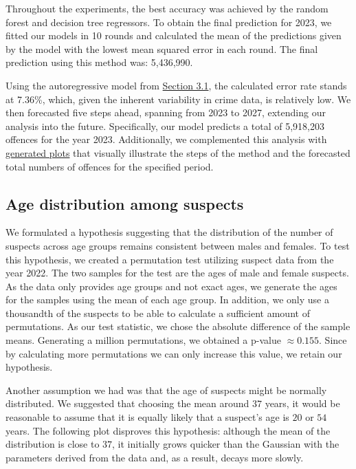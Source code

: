 \documentclass{article}
\theoremstyle{plain}
\theoremstyle{definition}
\theoremstyle{remark}
\begin{document}
Throughout the experiments, the best accuracy was achieved by the random forest and decision tree regressors. To obtain the final prediction for 2023, we fitted our models in 10 rounds and calculated the mean of the predictions given by the model with the lowest mean squared error in each round. The final prediction using this method was: 5,436,990.



Using the autoregressive model from \hyperref[subsec:methods_prediction]{Section 3.1}, the calculated error rate stands at 7.36\%, which, given the inherent variability in crime data, is relatively low. We then forecasted five steps ahead, spanning from 2023 to 2027, extending our analysis into the future. Specifically, our model predicts a total of 5,918,203 offences for the year 2023. Additionally, we complemented this analysis with \href{https://github.com/rojan-abolhasani/Order-in-Chaos-Understanding-Criminal-Patterns-in-Germany}{generated plots} that visually illustrate the steps of the method and the forecasted total numbers of offences for the specified period.

\subsection{Age distribution among suspects}



We formulated a hypothesis suggesting that the distribution of the number of suspects across age groups remains consistent between males and females. To test this hypothesis, we created a permutation test utilizing suspect data from the year 2022. The two samples for the test are the ages of male and female suspects. As the data only provides age groups and not exact ages, we generate the ages for the samples using the mean of each age group. In addition, we only use a thousandth of the suspects to be able to calculate a sufficient amount of permutations. As our test statistic, we chose the absolute difference of the sample means. Generating a million permutations, we obtained a p-value $\approx 0.155$. Since by calculating more permutations we can only increase this value, we retain our hypothesis.

Another assumption we had was that the age of suspects might be normally distributed. We suggested that choosing the mean around $37$ years, it would be reasonable to assume that it is equally likely that a suspect's age is $20$ or $54$ years. The following plot disproves this hypothesis: although the mean of the distribution is close to $37$, it initially grows quicker than the Gaussian with the parameters derived from the data and, as a result, decays more slowly.
\end{document}
